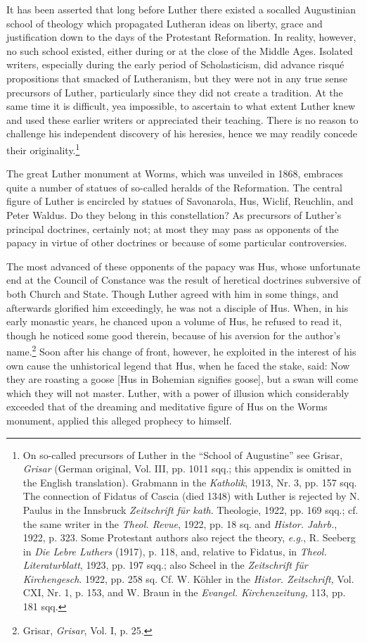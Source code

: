 It has been asserted that long before Luther there existed a socalled Augustinian
school of theology which propagated Lutheran
ideas on liberty, grace and justification down to the days of the
Protestant Reformation. In reality, however, no such school existed,
either during or at the close of the Middle Ages. Isolated writers,
especially during the early period of Scholasticism, did advance risqué
propositions that smacked of Lutheranism, but they were not in
any true sense precursors of Luther, particularly since they did not
create a tradition. At the same time it is difficult, yea impossible,
to ascertain to what extent Luther knew and used these earlier
writers or appreciated their teaching. There is no reason to challenge
his independent discovery of his heresies, hence we may readily concede
their originality.\footnote{On so-called precursors of Luther in the “School of Augustine” see Grisar, \textit{Grisar}
(German original, Vol. III, pp. 1011 sqq.; this appendix is omitted in the English translation).
Grabmann in the \textit{Katholik}, 1913, Nr. 3, pp. 157 sqq. The connection of Fidatus
of Cascia (died 1348) with Luther is rejected by N. Paulus in the Innsbruck \textit{Zeitschrift
für kath}. Theologie, 1922, pp. 169 sqq.; cf. the same writer in the \textit{Theol. Revue}, 1922,
pp. 18 sq. and \textit{Histor. Jahrb.}, 1922, p. 323. Some Protestant authors also reject the theory,
\textit{e.g.}, R. Seeberg in \textit{Die Lebre Luthers} (1917), p. 118, and, relative to Fidatus, in \textit{Theol.
Literaturblatt}, 1923, pp. 197 sqq.; also Scheel in the \textit{Zeitschrift für Kirchengesch}. 1922,
pp. 258 sq. Cf. W. Köhler in the \textit{Histor. Zeitschrift,} Vol. CXI, Nr. 1, p. 153, and W.
Braun in the \textit{Evangel. Kirchenzeitung,} 113, pp. 181 sqq.
}

The great Luther monument at Worms, which was unveiled in
1868, embraces quite a number of statues of so-called heralds of
the Reformation. The central figure of Luther is encircled by
statues of Savonarola, Hus, Wiclif, Reuchlin, and Peter Waldus.
Do they belong in this constellation? As precursors of Luther’s principal
doctrines, certainly not; at most they may pass as opponents
of the papacy in virtue of other doctrines or because of some particular
controversies.

The most advanced of these opponents of the papacy was Hus,
whose unfortunate end at the Council of Constance was the result
of heretical doctrines subversive of both Church and State. Though
Luther agreed with him in some things, and afterwards glorified him
exceedingly, he was not a disciple of Hus. When, in his early monastic
years, he chanced upon a volume of Hus, he refused to read
it, though he noticed some good therein, because of his aversion
for the author’s name.\footnote{Grisar, \textit{Grisar}, Vol. I, p. 25.}
Soon after his change of front, however,
he exploited in the interest of his own cause the unhistorical legend
that Hus, when he faced the stake, said: Now they are roasting a
goose [Hus in Bohemian signifies goose], but a swan will come which
they will not master. Luther, with a power of illusion which considerably
exceeded that of the dreaming and meditative figure of
Hus on the Worms monument, applied this alleged prophecy to
himself.

